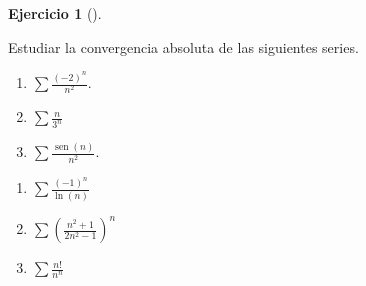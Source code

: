 \documentclass[
  spanish,
  a4paper,
]{scrreport}
\theoremstyle{definition}
\newtheorem{exercise}{Ejercicio}[chapter]
\theoremstyle{remark}
\begin{document}
\begin{exercise}[]\protect\hypertarget{exr-convergencia-absoluta}{}\label{exr-convergencia-absoluta}

Estudiar la convergencia absoluta de las siguientes series.

\begin{enumerate}
\def\labelenumi{\alph{enumi}.}
\item
  \(\sum \frac{(-2)^n}{n^2}\).
\item
  \(\sum \frac{n}{3^n}\)
\item
  \(\sum \frac{\operatorname{sen}(n)}{n^2}\).
\end{enumerate}

\begin{enumerate}
\def\labelenumi{\alph{enumi}.}
\setcounter{enumi}{3}
\item
  \(\sum \frac{(-1)^n}{\ln(n)}\)
\item
  \(\sum \left(\frac{n^2+1}{2n^2-1}\right)^n\)
\item
  \(\sum \frac{n!}{n^n}\)
\end{enumerate}

\end{exercise}
\end{document}
